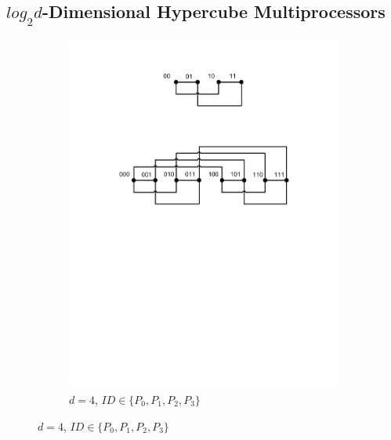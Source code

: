 \documentclass[submission]{iacrtrans}
\theoremstyle{plain}
\begin{document}
\subsection{$log_2d$-Dimensional Hypercube Multiprocessors}
\begin{figure}[!tb]
\centering
\begin{subfigure}[t]{0.5\textwidth}\centering
\includegraphics[width=\textwidth]{./fig/HyperCube1.pdf}
\caption{$d=4$, $ID\in\{P_0,P_1,P_2,P_3\}$}
\label{fig:dit1}
\end{subfigure}


\end{figure}
\end{document}
